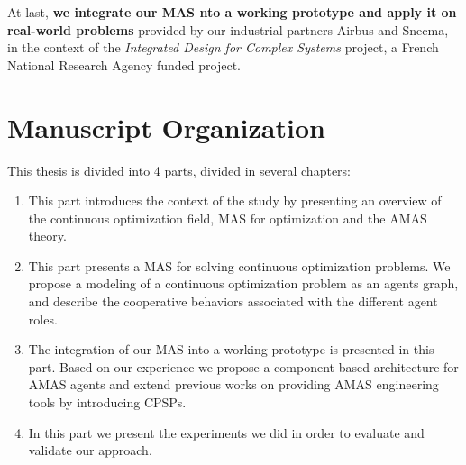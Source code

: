 At last, \textbf{we integrate our MAS nto a working prototype and apply it on real-world problems} provided by our industrial partners Airbus and Snecma, in the context of the \emph{Integrated Design for Complex Systems} project, a French National Research Agency funded project.

\newpage
\section*{Manuscript Organization}

This thesis is divided into 4 parts, divided in several chapters:
\begin{enumerate}[P{a}rt I.] %
\item This part introduces the context of the study by presenting an overview of the continuous optimization field, MAS for optimization and the AMAS theory.
\item This part presents a MAS for solving continuous optimization problems. We propose a modeling of a continuous optimization problem as an agents graph, and describe the cooperative behaviors associated with the different agent roles.
\item The integration of our MAS into a working prototype is presented in this part. Based on our experience we propose a component-based architecture for AMAS agents and extend previous works on providing AMAS engineering tools by introducing CPSPs.
\item In this part we present the experiments we did in order to evaluate and validate our approach.
\end{enumerate}